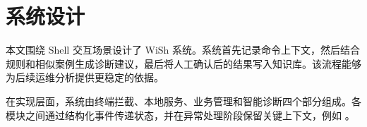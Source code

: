 \section{系统设计}
\label{sec:design}

本文围绕 Shell 交互场景设计了 WiSh 系统。系统首先记录命令上下文，然后结合规则和相似案例生成诊断建议，最后将人工确认后的结果写入知识库。该流程能够为后续运维分析提供更稳定的依据。

在实现层面，系统由终端拦截、本地服务、业务管理和智能诊断四个部分组成。各模块之间通过结构化事件传递状态，并在异常处理阶段保留关键上下文，例如 \cite{ref1}。
